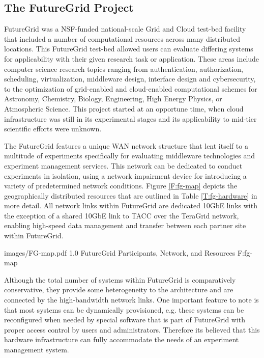 \subsection{The FutureGrid Project}


FutureGrid was a NSF-funded national-scale Grid and Cloud test-bed facility that included a number of computational resources across many distributed locations.  This FutureGrid test-bed allowed users can evaluate differing systems for applicability with their given research task or application. These areas include computer science research topics ranging from authentication, authorization, scheduling, virtualization, middleware design, interface design and cybersecurity, to the optimization of grid-enabled and cloud-enabled computational schemes for  Astronomy, Chemistry, Biology, Engineering, High Energy Physics, or Atmospheric Science. This project started at an opportune time, when cloud infrastructure was still in its experimental stages and its applicability to mid-tier scientific efforts were unknown. 

The FutureGrid  features a unique WAN network structure that lent itself to a multitude of experiments specifically for evaluating middleware technologies and experiment management services.  This network can be dedicated to conduct experiments in isolation, using a network impairment device for introducing a variety of predetermined network conditions. Figure \ref{F:fg-map} depicts the geographically distributed resources that are outlined in Table \ref{T:fg-hardware} in more detail. All network links within FutureGrid are dedicated 10GbE links with the exception of a shared 10GbE link to TACC over the TeraGrid \cite{berman2001tkg, catlett2002philosophy} network, enabling high-speed data management and transfer between each partner site within FutureGrid.
   
  {images/FG-map.pdf}
  {1.0}
  {FutureGrid Participants, Network, and Resources}
  {F:fg-map}

Although the total number of systems within FutureGrid is comparatively conservative, they provide some heterogeneity to the architecture and are connected by the high-bandwidth network links. One important feature to note is that most systems can be dynamically provisioned, e.g. these systems can be reconfigured when needed by special software that is part of FutureGrid with proper access control by users and administrators.  Therefore its believed that this hardware infrastructure can fully accommodate the needs of an experiment management system.

